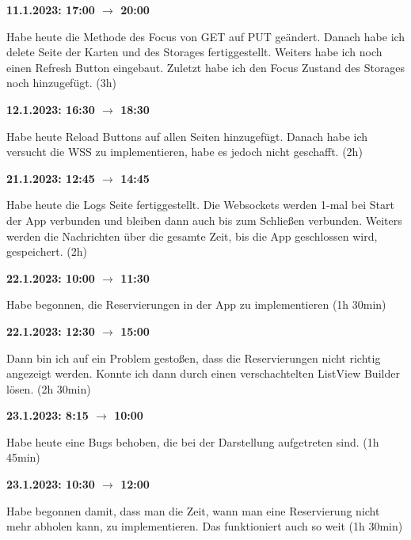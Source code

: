 \vspace{0.5cm}

\textbf{11.1.2023: 17:00 $\rightarrow$ 20:00} \

Habe heute die Methode des Focus von GET auf PUT geändert. Danach habe ich delete Seite der Karten und des Storages fertiggestellt. Weiters habe ich noch einen Refresh Button eingebaut. Zuletzt habe ich den Focus Zustand des Storages noch hinzugefügt. (3h)

\vspace{0.5cm}

\textbf{12.1.2023: 16:30 $\rightarrow$ 18:30} \

Habe heute Reload Buttons auf allen Seiten hinzugefügt. Danach habe ich versucht die WSS zu implementieren, habe es jedoch nicht geschafft. (2h)

\vspace{0.5cm}

\textbf{21.1.2023: 12:45 $\rightarrow$ 14:45} \

Habe heute die Logs Seite fertiggestellt. Die Websockets werden 1-mal bei Start der App verbunden und bleiben dann auch bis zum Schließen verbunden. Weiters werden die Nachrichten über die gesamte Zeit, bis die App geschlossen wird, gespeichert. (2h)

\vspace{0.5cm}

\textbf{22.1.2023: 10:00 $\rightarrow$ 11:30} \

Habe begonnen, die Reservierungen in der App zu implementieren (1h 30min)

\vspace{0.5cm}

\textbf{22.1.2023: 12:30 $\rightarrow$ 15:00} \

Dann bin ich auf ein Problem gestoßen, dass die Reservierungen nicht richtig angezeigt werden. Konnte ich dann durch einen verschachtelten ListView Builder lösen. (2h 30min)

\vspace{0.5cm}

\textbf{23.1.2023: 8:15 $\rightarrow$ 10:00} \

Habe heute eine Bugs behoben, die bei der Darstellung aufgetreten sind. (1h 45min)

\vspace{0.5cm}

\textbf{23.1.2023: 10:30 $\rightarrow$ 12:00} \

Habe begonnen damit, dass man die Zeit, wann man eine Reservierung nicht mehr abholen kann, zu implementieren. Das funktioniert auch so weit (1h 30min)

